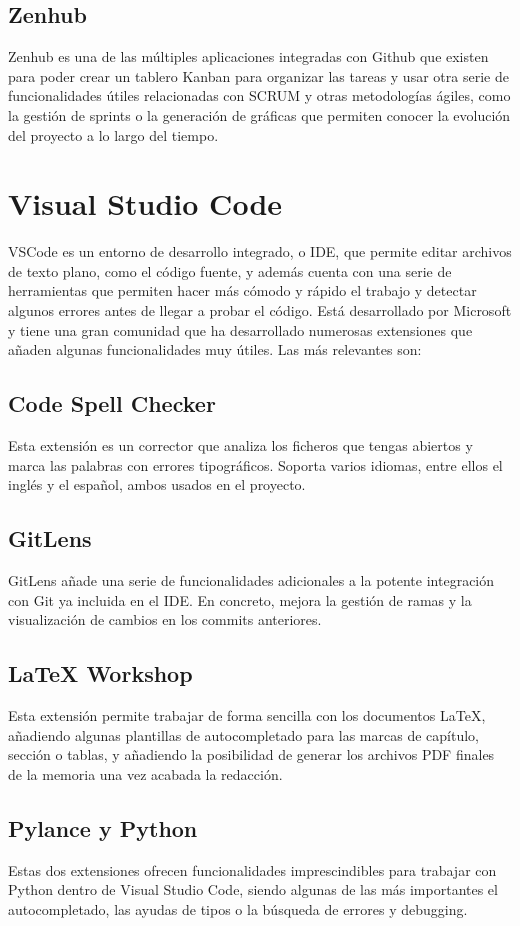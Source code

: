 \subsection{Zenhub}
Zenhub es una de las múltiples aplicaciones integradas con Github que existen para poder crear un tablero Kanban para organizar las tareas y usar otra serie de funcionalidades útiles relacionadas con SCRUM y otras metodologías ágiles, como la gestión de sprints o la generación de gráficas que permiten conocer la evolución del proyecto a lo largo del tiempo.

\section{Visual Studio Code}
VSCode es un entorno de desarrollo integrado, o IDE, que permite editar archivos de texto plano, como el código fuente, y además cuenta con una serie de herramientas que permiten hacer más cómodo y rápido el trabajo y detectar algunos errores antes de llegar a probar el código. Está desarrollado por Microsoft y tiene una gran comunidad que ha desarrollado numerosas extensiones que añaden algunas funcionalidades muy útiles. Las más relevantes son:
\subsection{Code Spell Checker}
Esta extensión es un corrector que analiza los ficheros que tengas abiertos y marca las palabras con errores tipográficos. Soporta varios idiomas, entre ellos el inglés y el español, ambos usados en el proyecto.
\subsection{GitLens}
GitLens añade una serie de funcionalidades adicionales a la potente integración con Git ya incluida en el IDE. En concreto, mejora la gestión de ramas y la visualización de cambios en los commits anteriores.
\subsection{LaTeX Workshop}
Esta extensión permite trabajar de forma sencilla con los documentos LaTeX, añadiendo algunas plantillas de autocompletado para las marcas de capítulo, sección o tablas, y añadiendo la posibilidad de generar los archivos PDF finales de la memoria una vez acabada la redacción.
\subsection{Pylance y Python}
Estas dos extensiones ofrecen funcionalidades imprescindibles para trabajar con Python dentro de Visual Studio Code, siendo algunas de las más importantes el autocompletado, las ayudas de tipos o la búsqueda de errores y debugging.
